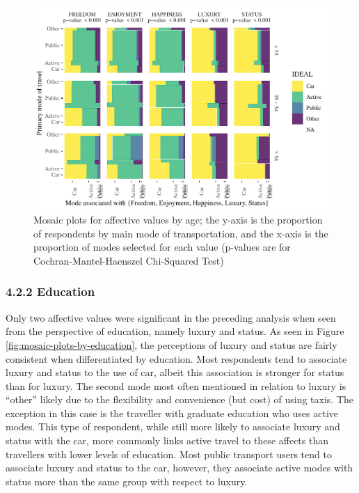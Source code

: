 \documentclass[]{elsarticle} %
\makeatletter
\def\maxwidth{\ifdim\Gin@nat@width>\linewidth\linewidth
\else\Gin@nat@width\fi}
\let\Oldincludegraphics\includegraphics
\renewcommand{\includegraphics}[1]{\Oldincludegraphics[width=\maxwidth]{#1}}
\makeatother
\begin{document}
\begin{figure}
\centering
\includegraphics{Dissonance_Santiago_v1_files/figure-latex/figure-mosaic-plots-by-attribute-and-age-1.pdf}
\caption{\label{fig:mosaic-plots-by-age}Mosaic plots for affective
values by age; the y-axis is the proportion of respondents by main mode
of transportation, and the x-axis is the proportion of modes selected
for each value (p-values are for Cochran-Mantel-Haenszel Chi-Squared
Test)}
\end{figure}

\hypertarget{education-1}{%
\subsubsection{4.2.2 Education}\label{education-1}}

Only two affective values were significant in the preceding analysis
when seen from the perspective of education, namely luxury and status.
As seen in Figure \ref{fig:mosaic-plots-by-education}, the perceptions
of luxury and status are fairly consistent when differentiated by
education. Most respondents tend to associate luxury and status to the
use of car, albeit this association is stronger for status than for
luxury. The second mode most often mentioned in relation to luxury is
``other'' likely due to the flexibility and convenience (but cost) of
using taxis. The exception in this case is the traveller with graduate
education who uses active modes. This type of respondent, while still
more likely to associate luxury and status with the car, more commonly
links active travel to these affects than travellers with lower levels
of education. Most public transport users tend to associate luxury and
status to the car, however, they associate active modes with status more
than the same group with respect to luxury.
\end{document}
